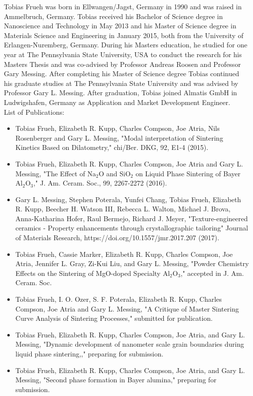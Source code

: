 \vspace*{-2mm}
Tobias Frueh was born in Ellwangen/Jagst, Germany in 1990 and was raised in Ammelbruch, Germany. Tobias received his Bachelor of Science degree in Nanoscience and Technology in May 2013 and his Master of Science degree in Materials Science and Engineering in January 2015, both from the University of Erlangen-Nuremberg, Germany. During his Masters education, he studied for one year at The Pennsylvania State University, USA to conduct the research for his Masters Thesis and was co-advised by Professor Andreas Roosen and Professor Gary Messing. After completing his Master of Science degree Tobias continued his graduate studies at The Pennsylvania State University and was advised by Professor Gary L. Messing. After graduation, Tobias joined Almatis GmbH in Ludwigshafen, Germany as Application and Market Development Engineer.
\\
\newline
\noindent List of Publications:
\begin{itemize}
	\item Tobias Frueh, Elizabeth R. Kupp, Charles Compson, Joe Atria, Nils Rosenberger and Gary L. Messing, "Modal interpretation of Sintering Kinetics Based on Dilatometry," chi/Ber. DKG, 92, E1-4 (2015). 
	\item Tobias Frueh, Elizabeth R. Kupp, Charles Compson, Joe Atria and Gary L. Messing, "The Effect of Na$_{2}$O and SiO$_{2}$ on Liquid Phase Sintering of Bayer Al$_{2}$O$_{3}$," J. Am. Ceram. Soc., 99, 2267-2272 (2016).
	\item Gary L. Messing, Stephen Poterala, Yunfei Chang, Tobias Frueh, Elizabeth R. Kupp, Beecher H. Watson III, Rebecca L. Walton, Michael J. Brova, Anna-Katharina Hofer, Raul Bermejo, Richard J. Meyer, "Texture-engineered ceramics - Property enhancements through crystallographic tailoring" Journal of Materials Research, https://doi.org/10.1557/jmr.2017.207 (2017).
	\item Tobias Frueh, Cassie Marker, Elizabeth R. Kupp, Charles Compson, Joe Atria, Jennifer L. Gray, Zi-Kui Liu, and Gary L. Messing, "Powder Chemistry Effects on the Sintering of MgO-doped Specialty Al$_{2}$O$_{3}$," accepted in J. Am. Ceram. Soc.
	\item Tobias Frueh, I. O. Ozer, S. F. Poterala, Elizabeth R. Kupp, Charles Compson, Joe Atria and Gary L. Messing, "A Critique of Master Sintering Curve Analysis of Sintering Processes," submitted for publication.
	\item Tobias Frueh, Elizabeth R. Kupp, Charles Compson, Joe Atria, and Gary L. Messing, "Dynamic development of nanometer scale grain boundaries during liquid phase sintering,," preparing for submission.
	\item Tobias Frueh, Elizabeth R. Kupp, Charles Compson, Joe Atria, and Gary L. Messing, "Second phase formation in Bayer alumina," preparing for submission.
\end{itemize}